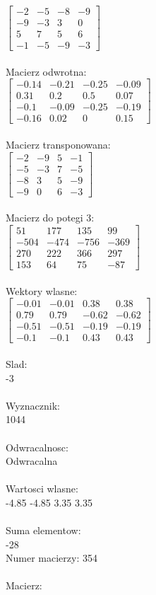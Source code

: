 \documentclass[a4paper,12pt]{article}
\begin{document}
$\begin{bmatrix} -2&-5&-8&-9\\-9&-3&3&0\\5&7&5&6\\-1&-5&-9&-3 \end{bmatrix}$
\\
\\
Macierz odwrotna:\\

$\begin{bmatrix} -0.14&-0.21&-0.25&-0.09\\0.31&0.2&0.5&0.07\\-0.1&-0.09&-0.25&-0.19\\-0.16&0.02&0&0.15 \end{bmatrix}$
\\
\\
Macierz transponowana:\\

$\begin{bmatrix} -2&-9&5&-1\\-5&-3&7&-5\\-8&3&5&-9\\-9&0&6&-3 \end{bmatrix}$
\\
\\
Macierz do potegi 3:\\

$\begin{bmatrix} 51&177&135&99\\-504&-474&-756&-369\\270&222&366&297\\153&64&75&-87 \end{bmatrix}$
\\
\\
Wektory wlasne:\\

$\begin{bmatrix} -0.01&-0.01&0.38&0.38\\0.79&0.79&-0.62&-0.62\\-0.51&-0.51&-0.19&-0.19\\-0.1&-0.1&0.43&0.43 \end{bmatrix}$
\\
\\
Slad:\\
-3
\\
\\
Wyznacznik:\\
1044
\\
\\
Odwracalnosc:\\
Odwracalna
\\
\\
Wartosci wlasne:\\
-4.85 -4.85 3.35 3.35
\\
\\
Suma elementow:\\
-28
\\
\newpage
Numer macierzy:
354
\\
\\
Macierz:\\
\end{document}

